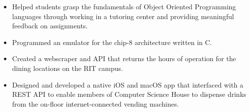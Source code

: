 \documentclass[10pt,letter,ragged2e]{altacv}
\begin{document}
\begin{itemize}
    \item Helped students grasp the fundamentals of Object Oriented Programming languages through working in a tutoring center and providing meaningful feedback on assignments.
\end{itemize}


\begin{itemize}
  \item Programmed an emulator for the chip-8 architecture written in C.
\end{itemize}

\divider

\begin{itemize}
  \item Created a webscraper and API that returns the hours of operation for the dining locations on the RIT campus.
\end{itemize}

\divider

\begin{itemize}
  \item Designed and developed a native iOS and macOS app that interfaced with a REST API to enable members of Computer Science House to dispense drinks from the on-floor internet-connected vending machines. 
\end{itemize}
%

\clearpage
\end{document}
